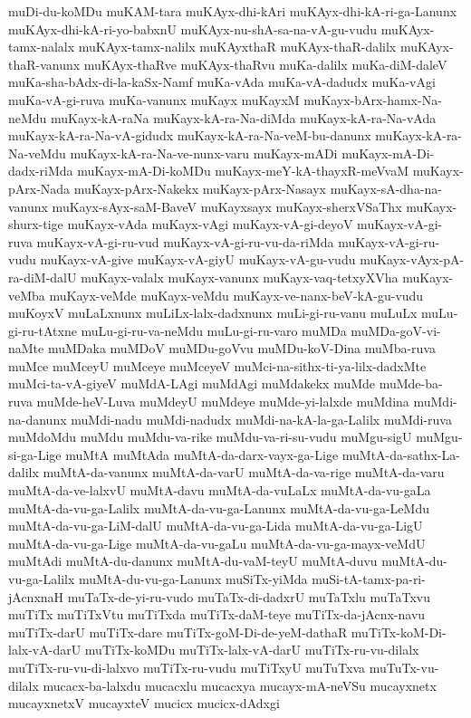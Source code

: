{muDi-du-koMDu
muKAM-tara
muKAyx-dhi-kAri
muKAyx-dhi-kA-ri-ga-Lanunx
muKAyx-dhi-kA-ri-yo-babxnU
muKAyx-nu-shA-sa-na-vA-gu-vudu
muKAyx-tamx-nalalx
muKAyx-tamx-nalilx
muKAyxthaR
muKAyx-thaR-dalilx
muKAyx-thaR-vanunx
muKAyx-thaRve
muKAyx-thaRvu
muKa-dalilx
muKa-diM-daleV
muKa-sha-bAdx-di-la-kaSx-Namf
muKa-vAda
muKa-vA-dadudx
muKa-vAgi
muKa-vA-gi-ruva
muKa-vanunx
muKayx
muKayxM
muKayx-bArx-hamx-Na-neMdu
muKayx-kA-raNa
muKayx-kA-ra-Na-diMda
muKayx-kA-ra-Na-vAda
muKayx-kA-ra-Na-vA-gidudx
muKayx-kA-ra-Na-veM-bu-danunx
muKayx-kA-ra-Na-veMdu
muKayx-kA-ra-Na-ve-nunx-varu
muKayx-mADi
muKayx-mA-Di-dadx-riMda
muKayx-mA-Di-koMDu
muKayx-meY-kA-thayxR-meVvaM
muKayx-pArx-Nada
muKayx-pArx-Nakekx
muKayx-pArx-Nasayx
muKayx-sA-dha-na-vanunx
muKayx-sAyx-saM-BaveV
muKayxsayx
muKayx-sherxVSaThx
muKayx-shurx-tige
muKayx-vAda
muKayx-vAgi
muKayx-vA-gi-deyoV
muKayx-vA-gi-ruva
muKayx-vA-gi-ru-vud
muKayx-vA-gi-ru-vu-da-riMda
muKayx-vA-gi-ru-vudu
muKayx-vA-give
muKayx-vA-giyU
muKayx-vA-gu-vudu
muKayx-vAyx-pA-ra-diM-dalU
muKayx-valalx
muKayx-vanunx
muKayx-vaq-tetxyXVha
muKayx-veMba
muKayx-veMde
muKayx-veMdu
muKayx-ve-nanx-beV-kA-gu-vudu
muKoyxV
muLaLxnunx
muLiLx-lalx-dadxnunx
muLi-gi-ru-vanu
muLuLx
muLu-gi-ru-tAtxne
muLu-gi-ru-va-neMdu
muLu-gi-ru-varo
muMDa
muMDa-goV-vi-naMte
muMDaka
muMDoV
muMDu-goVvu
muMDu-koV-Dina
muMba-ruva
muMce
muMceyU
muMceye
muMceyeV
muMci-na-sithx-ti-ya-lilx-dadxMte
muMci-ta-vA-giyeV
muMdA-LAgi
muMdAgi
muMdakekx
muMde
muMde-ba-ruva
muMde-heV-Luva
muMdeyU
muMdeye
muMde-yi-lalxde
muMdina
muMdi-na-danunx
muMdi-nadu
muMdi-nadudx
muMdi-na-kA-la-ga-Lalilx
muMdi-ruva
muMdoMdu
muMdu
muMdu-va-rike
muMdu-va-ri-su-vudu
muMgu-sigU
muMgu-si-ga-Lige
muMtA
muMtAda
muMtA-da-darx-vayx-ga-Lige
muMtA-da-sathx-La-dalilx
muMtA-da-vanunx
muMtA-da-varU
muMtA-da-va-rige
muMtA-da-varu
muMtA-da-ve-lalxvU
muMtA-davu
muMtA-da-vuLaLx
muMtA-da-vu-gaLa
muMtA-da-vu-ga-Lalilx
muMtA-da-vu-ga-Lanunx
muMtA-da-vu-ga-LeMdu
muMtA-da-vu-ga-LiM-dalU
muMtA-da-vu-ga-Lida
muMtA-da-vu-ga-LigU
muMtA-da-vu-ga-Lige
muMtA-da-vu-gaLu
muMtA-da-vu-ga-mayx-veMdU
muMtAdi
muMtA-du-danunx
muMtA-du-vaM-teyU
muMtA-duvu
muMtA-du-vu-ga-Lalilx
muMtA-du-vu-ga-Lanunx
muSiTx-yiMda
muSi-tA-tamx-pa-ri-jAcnxnaH
muTaTx-de-yi-ru-vudo
muTaTx-di-dadxrU
muTaTxlu
muTaTxvu
muTiTx
muTiTxVtu
muTiTxda
muTiTx-daM-teye
muTiTx-da-jAcnx-navu
muTiTx-darU
muTiTx-dare
muTiTx-goM-Di-de-yeM-dathaR
muTiTx-koM-Di-lalx-vA-darU
muTiTx-koMDu
muTiTx-lalx-vA-darU
muTiTx-ru-vu-dilalx
muTiTx-ru-vu-di-lalxvo
muTiTx-ru-vudu
muTiTxyU
muTuTxva
muTuTx-vu-dilalx
mucacx-ba-lalxdu
mucacxlu
mucacxya
mucayx-mA-neVSu
mucayxnetx
mucayxnetxV
mucayxteV
mucicx
mucicx-dAdxgi
}
